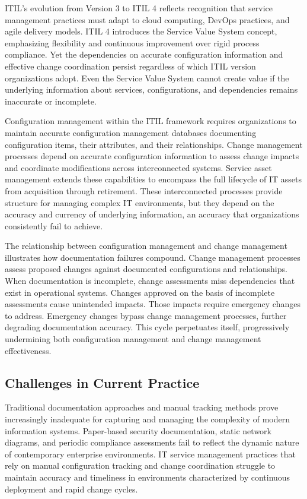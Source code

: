 ITIL's evolution from Version 3 to ITIL 4 reflects recognition that service management practices must adapt to cloud computing, DevOps practices, and agile delivery models. ITIL 4 introduces the Service Value System concept, emphasizing flexibility and continuous improvement over rigid process compliance. Yet the dependencies on accurate configuration information and effective change coordination persist regardless of which ITIL version organizations adopt. Even the Service Value System cannot create value if the underlying information about services, configurations, and dependencies remains inaccurate or incomplete.

Configuration management within the ITIL framework requires organizations to maintain accurate configuration management databases documenting configuration items, their attributes, and their relationships. Change management processes depend on accurate configuration information to assess change impacts and coordinate modifications across interconnected systems. Service asset management extends these capabilities to encompass the full lifecycle of IT assets from acquisition through retirement. These interconnected processes provide structure for managing complex IT environments, but they depend on the accuracy and currency of underlying information, an accuracy that organizations consistently fail to achieve.

The relationship between configuration management and change management illustrates how documentation failures compound. Change management processes assess proposed changes against documented configurations and relationships. When documentation is incomplete, change assessments miss dependencies that exist in operational systems. Changes approved on the basis of incomplete assessments cause unintended impacts. Those impacts require emergency changes to address. Emergency changes bypass change management processes, further degrading documentation accuracy. This cycle perpetuates itself, progressively undermining both configuration management and change management effectiveness.

\subsection{Challenges in Current Practice}

Traditional documentation approaches and manual tracking methods prove increasingly inadequate for capturing and managing the complexity of modern information systems. Paper-based security documentation, static network diagrams, and periodic compliance assessments fail to reflect the dynamic nature of contemporary enterprise environments. IT service management practices that rely on manual configuration tracking and change coordination struggle to maintain accuracy and timeliness in environments characterized by continuous deployment and rapid change cycles.

